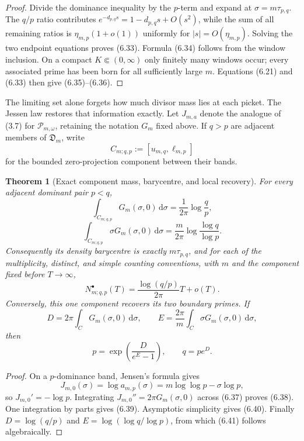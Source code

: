 \documentclass[11pt]{article}
\newtheorem{theorem}{Theorem}[section]
\theoremstyle{definition}
\theoremstyle{remark}
\newcommand{\cP}{\mathcal P}
\newcommand{\dd}{\,\mathrm d}
\begin{document}
\begin{proof}
Divide the dominance inequality by the $p$-term and expand at
$\sigma=m\tau_{p,q}$.  The $q/p$ ratio contributes
$e^{-d_{p,q}s}=1-d_{p,q}s+O(s^2)$, while the sum of all remaining
ratios is $\eta_{m,p}(1+o(1))$ uniformly for
$|s|=O(\eta_{m,p})$.  Solving the two endpoint equations proves
(6.33).  Formula (6.34) follows from the window inclusion.  On a compact
$K\Subset(0,\infty)$ only finitely many windows occur; every associated
prime has been born for all sufficiently large $m$.  Equations
(6.21) and (6.33) then give (6.35)--(6.36).
\end{proof}

The limiting set alone forgets how much divisor mass lies at each
picket.  The Jessen law restores that information exactly.  Let
$J_{m,a}$ denote the analogue of (3.7) for $\cP_{m,\omega}$, retaining
the notation $G_m$ fixed above.  If $q>p$ are adjacent members of
$\mathfrak D_m$,
write
\[
 C_{m;q,p}:=[u_{m,q},\ell_{m,p}]
\tag{6.37}
\]
for the bounded zero-projection component between their bands.

\begin{theorem}[Exact component mass, barycentre, and local recovery]
\label{thm:component-tomography}
For every adjacent dominant pair $p<q$,
\[
 \boxed{
 \int_{C_{m;q,p}}G_m(\sigma,0)\dd\sigma
 =\frac1{2\pi}\log\frac qp,}
\tag{6.38}
\]
\[
 \boxed{
 \int_{C_{m;q,p}}\sigma G_m(\sigma,0)\dd\sigma
 =\frac m{2\pi}\log\frac{\log q}{\log p}.}
\tag{6.39}
\]
Consequently its density barycentre is exactly $m\tau_{p,q}$, and for
each of the multiplicity, distinct, and simple counting conventions, with $m$ and
the component fixed before $T\to\infty$,
\[
 N_{m;q,p}^{\bullet}(T)
 =\frac{\log(q/p)}{2\pi}T+o(T).
\tag{6.40}
\]
Conversely, this one component recovers its two boundary primes.  If
\[
 D=2\pi\int_CG_m(\sigma,0)\dd\sigma,
 \qquad
 E=\frac{2\pi}{m}\int_C\sigma G_m(\sigma,0)\dd\sigma,
\]
then
\[
 \boxed{
 p=\exp\!\left(\frac{D}{e^E-1}\right),
 \qquad q=pe^D.}
\tag{6.41}
\]
\end{theorem}

\begin{proof}
On a $p$-dominance band, Jensen's formula gives
\[
 J_{m,0}(\sigma)=\log a_{m,p}(\sigma)
 =m\log\log p-\sigma\log p,
\]
so $J_{m,0}'=-\log p$.  Integrating
$J_{m,0}''=2\pi G_m(\sigma,0)$ across (6.37) proves (6.38).
One integration by parts gives (6.39).  Asymptotic simplicity gives
(6.40).  Finally $D=\log(q/p)$ and
$E=\log(\log q/\log p)$, from which (6.41) follows algebraically.
\end{proof}
\end{document}
